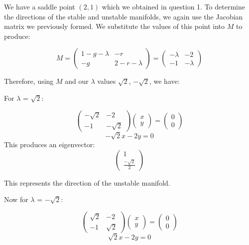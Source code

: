 \documentclass[11pt]{article}
\begin{document}
   We have a saddle point $(2,1)$ which we obtained in question 1. To determine the directions of the stable and unstable manifolds, we again use the Jacobian matrix we previously formed. We substitute the values of this point into $M$ to produce:

   \[
        M = \begin{pmatrix} 1 - g - \lambda  & - r \\ - g & 2 - r - \lambda
        \end{pmatrix}
         = \begin{pmatrix} - \lambda  & - 2 \\ - 1 &  - \lambda
        \end{pmatrix}
    \]

    Therefore, using $M$ and our $\lambda$ values $\sqrt{2}$, $-\sqrt{2}$, we have:

    For $\lambda$ = $\sqrt{2}$:

 \[
         \begin{pmatrix} -\sqrt2   & - 2 \\ - 1 &  -\sqrt2
        \end{pmatrix} \begin{pmatrix} x \\ y
        \end{pmatrix}
         = \begin{pmatrix} 0  \\ 0
        \end{pmatrix}
    \]
    \[
        -\sqrt{2}x -2y = 0
    \]
This produces an eigenvector:
\[
         \begin{pmatrix} 1  \\ \frac{-\sqrt{2}}{2}
        \end{pmatrix}
 \]

This represents the direction of the unstable manifold.

Now for $\lambda$ = $-\sqrt{2}$:

     \[
         \begin{pmatrix} \sqrt2   & - 2 \\ - 1 &  \sqrt2
        \end{pmatrix} \begin{pmatrix} x \\ y
        \end{pmatrix}
         = \begin{pmatrix} 0  \\ 0
        \end{pmatrix}
    \]
    \[
        \sqrt{2}x -2y = 0
    \]
\end{document}
